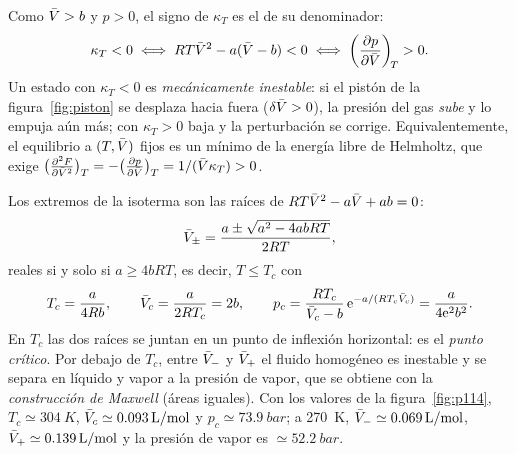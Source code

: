 \begin{observacion}\label{obs:kneg}
Como $\bar{V}>b$ y $p>0$, el signo de $\kappa_T$ es el de su denominador:
\[
  \kappa_T<0\iff RT\bar{V}^2-a(\bar{V}-b)<0\iff\left(\frac{\partial p}{\partial \bar{V}}\right)_{\!T}>0.
\]
Un estado con $\kappa_T<0$ es \emph{mecánicamente inestable}: si el pistón de la figura~\ref{fig:piston}
se desplaza hacia fuera ($\delta\bar{V}>0$), la presión del gas \emph{sube} y lo empuja aún más; con
$\kappa_T>0$ baja y la perturbación se corrige. Equivalentemente, el equilibrio a $(T,\bar{V})$ fijos es un
mínimo de la energía libre de Helmholtz, que exige
$\bigl(\tfrac{\partial ^2F}{\partial \bar{V}^2}\bigr)_{T}=-\bigl(\tfrac{\partial p}{\partial \bar{V}}\bigr)_{T}=1/(\bar{V}\kappa_T)>0$.

 Los extremos de la isoterma son las raíces de $RT\bar{V}^2-a\bar{V}+ab=0$:
\[
  \bar{V}_\pm=\frac{a\pm\sqrt{a^2-4abRT}}{2RT},
\]
reales si y solo si $a\geq4bRT$, es decir, $T\leq T_c$ con
\[
  T_c=\frac{a}{4Rb},\qquad\bar{V}_c=\frac{a}{2RT_c}=2b,\qquad p_c=\frac{RT_c}{\bar{V}_c-b}\,\mathrm{e}^{-a/(RT_c\bar{V}_c)}=\frac{a}{4\mathrm{e}^2b^2}.
\]
En $T_c$ las dos raíces se juntan en un punto de inflexión horizontal: es el \emph{punto crítico}. Por
debajo de $T_c$, entre $\bar{V}_-$ y $\bar{V}_+$ el fluido homogéneo es inestable y se separa en líquido y
vapor a la presión de vapor, que se obtiene con la \emph{construcción de Maxwell} (áreas iguales). Con
los valores de la figura~\ref{fig:p114}, $T_c\simeq\SI{304}{K}$, $\bar{V}_c\simeq\SI{0,093}{L/mol}$ y
$p_c\simeq\SI{73,9}{bar}$; a \SI{270}{K}, $\bar{V}_-\simeq\SI{0,069}{L/mol}$, $\bar{V}_+\simeq\SI{0,139}{L/mol}$ y la
presión de vapor es $\simeq\SI{52,2}{bar}$.
\end{observacion}

